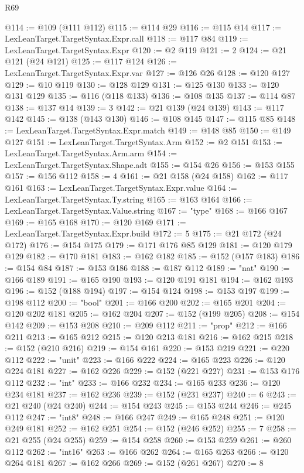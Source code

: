 \begin{lexlean}{R69}
\begin{coremodule}
@114 := @109 (@111 @112)
@115 := @114 @29
@116 := @115 @14
@117 := LexLeanTarget.TargetSyntax.Expr.call
@118 := @117 @84
@119 := LexLeanTarget.TargetSyntax.Expr
@120 := @2 @119
@121 := 2
@124 := @21 @121 (@24 @121)
@125 := @117 @124
@126 := LexLeanTarget.TargetSyntax.Expr.var
@127 := @126 @26
@128 := @120 @127
@129 := @10 @119
@130 := @128 @129
@131 := @125 @130
@133 := @120 @131 @129
@135 := @116 (@118 @133)
@136 := @108 @135
@137 := @114 @87
@138 := @137 @14
@139 := 3
@142 := @21 @139 (@24 @139)
@143 := @117 @142
@145 := @138 (@143 @130)
@146 := @108 @145
@147 := @115 @85
@148 := LexLeanTarget.TargetSyntax.Expr.match
@149 := @148 @85
@150 := @149 @127
@151 := LexLeanTarget.TargetSyntax.Arm
@152 := @2 @151
@153 := LexLeanTarget.TargetSyntax.Arm.arm
@154 := LexLeanTarget.TargetSyntax.Shape.adt
@155 := @154 @26
@156 := @153 @155
@157 := @156 @112
@158 := 4
@161 := @21 @158 (@24 @158)
@162 := @117 @161
@163 := LexLeanTarget.TargetSyntax.Expr.value
@164 := LexLeanTarget.TargetSyntax.Ty.string
@165 := @163 @164
@166 := LexLeanTarget.TargetSyntax.Value.string
@167 := "type"
@168 := @166 @167
@169 := @165 @168
@170 := @120 @169
@171 := LexLeanTarget.TargetSyntax.Expr.build
@172 := 5
@175 := @21 @172 (@24 @172)
@176 := @154 @175
@179 := @171 @176 @85 @129
@181 := @120 @179 @129
@182 := @170 @181
@183 := @162 @182
@185 := @152 (@157 @183)
@186 := @154 @84
@187 := @153 @186
@188 := @187 @112
@189 := "nat"
@190 := @166 @189
@191 := @165 @190
@193 := @120 @191 @181
@194 := @162 @193
@196 := @152 (@188 @194)
@197 := @154 @124
@198 := @153 @197
@199 := @198 @112
@200 := "bool"
@201 := @166 @200
@202 := @165 @201
@204 := @120 @202 @181
@205 := @162 @204
@207 := @152 (@199 @205)
@208 := @154 @142
@209 := @153 @208
@210 := @209 @112
@211 := "prop"
@212 := @166 @211
@213 := @165 @212
@215 := @120 @213 @181
@216 := @162 @215
@218 := @152 (@210 @216)
@219 := @154 @161
@220 := @153 @219
@221 := @220 @112
@222 := "unit"
@223 := @166 @222
@224 := @165 @223
@226 := @120 @224 @181
@227 := @162 @226
@229 := @152 (@221 @227)
@231 := @153 @176 @112
@232 := "int"
@233 := @166 @232
@234 := @165 @233
@236 := @120 @234 @181
@237 := @162 @236
@239 := @152 (@231 @237)
@240 := 6
@243 := @21 @240 (@24 @240)
@244 := @154 @243
@245 := @153 @244
@246 := @245 @112
@247 := "int8"
@248 := @166 @247
@249 := @165 @248
@251 := @120 @249 @181
@252 := @162 @251
@254 := @152 (@246 @252)
@255 := 7
@258 := @21 @255 (@24 @255)
@259 := @154 @258
@260 := @153 @259
@261 := @260 @112
@262 := "int16"
@263 := @166 @262
@264 := @165 @263
@266 := @120 @264 @181
@267 := @162 @266
@269 := @152 (@261 @267)
@270 := 8

\end{coremodule}
\end{lexlean}
